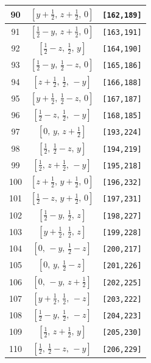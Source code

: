 \documentclass[fleqn,8pt]{jsarticle}
\begin{document}
\begin{longtable}{ccc}
90 & $\left[ y + \frac{1}{2},\, z + \frac{1}{2},\, 0 \right]$ & {\tt [162,189]} \\ \hline
91 & $\left[ \frac{1}{2} - y,\, z + \frac{1}{2},\, 0 \right]$ & {\tt [163,191]} \\ \hline
92 & $\left[ \frac{1}{2} - z,\, \frac{1}{2},\, y \right]$ & {\tt [164,190]} \\ \hline
93 & $\left[ \frac{1}{2} - y,\, \frac{1}{2} - z,\, 0 \right]$ & {\tt [165,186]} \\ \hline
94 & $\left[ z + \frac{1}{2},\, \frac{1}{2},\, - y \right]$ & {\tt [166,188]} \\ \hline
95 & $\left[ y + \frac{1}{2},\, \frac{1}{2} - z,\, 0 \right]$ & {\tt [167,187]} \\ \hline
96 & $\left[ \frac{1}{2} - z,\, \frac{1}{2},\, - y \right]$ & {\tt [168,185]} \\ \hline
97 & $\left[ 0,\, y,\, z + \frac{1}{2} \right]$ & {\tt [193,224]} \\ \hline
98 & $\left[ \frac{1}{2},\, \frac{1}{2} - z,\, y \right]$ & {\tt [194,219]} \\ \hline
99 & $\left[ \frac{1}{2},\, z + \frac{1}{2},\, - y \right]$ & {\tt [195,218]} \\ \hline
100 & $\left[ z + \frac{1}{2},\, y + \frac{1}{2},\, 0 \right]$ & {\tt [196,232]} \\ \hline
101 & $\left[ \frac{1}{2} - z,\, y + \frac{1}{2},\, 0 \right]$ & {\tt [197,231]} \\ \hline
102 & $\left[ \frac{1}{2} - y,\, \frac{1}{2},\, z \right]$ & {\tt [198,227]} \\ \hline
103 & $\left[ y + \frac{1}{2},\, \frac{1}{2},\, z \right]$ & {\tt [199,228]} \\ \hline
104 & $\left[ 0,\, - y,\, \frac{1}{2} - z \right]$ & {\tt [200,217]} \\ \hline
105 & $\left[ 0,\, y,\, \frac{1}{2} - z \right]$ & {\tt [201,226]} \\ \hline
106 & $\left[ 0,\, - y,\, z + \frac{1}{2} \right]$ & {\tt [202,225]} \\ \hline
107 & $\left[ y + \frac{1}{2},\, \frac{1}{2},\, - z \right]$ & {\tt [203,222]} \\ \hline
108 & $\left[ \frac{1}{2} - y,\, \frac{1}{2},\, - z \right]$ & {\tt [204,223]} \\ \hline
109 & $\left[ \frac{1}{2},\, z + \frac{1}{2},\, y \right]$ & {\tt [205,230]} \\ \hline
110 & $\left[ \frac{1}{2},\, \frac{1}{2} - z,\, - y \right]$ & {\tt [206,229]} \\ \hline

\end{longtable}
\end{document}
